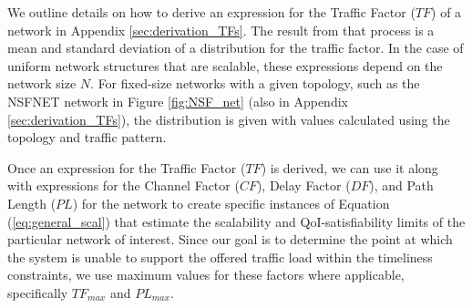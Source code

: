 {\color{blue}We outline details on how to derive an expression for the Traffic Factor ($TF$) of a network in Appendix \ref{sec:derivation_TFs}. The result from that process is a mean and standard deviation of a distribution for the traffic factor. In the case of uniform network structures that are scalable, these expressions depend on the network size $N$. For fixed-size networks with a given topology, such as the NSFNET network in Figure \ref{fig:NSF_net} (also in Appendix \ref{sec:derivation_TFs}), the distribution is given with values calculated using the topology and traffic pattern. }

Once an expression for the Traffic Factor ($TF$) is derived, we can use it along with expressions for the Channel Factor ($CF$), Delay Factor ($DF$), and Path Length ($PL$) for the network to create specific instances of Equation (\ref{eq:general_scal}) that estimate the scalability and QoI-satisfiability limits of the particular network of interest.  Since our goal is to determine the point at which the system is unable to support the offered traffic load within the timeliness constraints, we use maximum values for these factors where applicable, specifically $TF_{max}$ and $PL_{max}$. 


